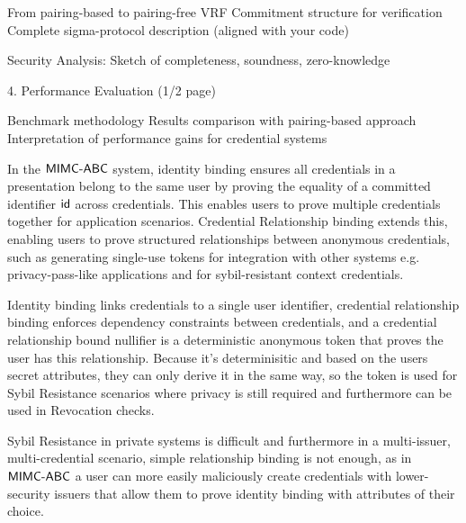 From pairing-based to pairing-free VRF
Commitment structure for verification
Complete sigma-protocol description (aligned with your code)


Security Analysis: Sketch of completeness, soundness, zero-knowledge







4. Performance Evaluation (1/2 page)

Benchmark methodology
Results comparison with pairing-based approach
Interpretation of performance gains for credential systems
























In the $\mathsf{MIMC\text{-}ABC}$ system, identity binding ensures all credentials in a presentation belong to the same user by proving the equality of a committed identifier $\mathsf{id}$ across credentials. This enables users to prove multiple credentials together for application scenarios.
Credential Relationship binding extends this, enabling users to prove structured relationships between anonymous credentials, such as generating single-use tokens for integration with other systems e.g. privacy-pass-like applications \cite{davidson2018privacy} and for sybil-resistant context credentials.

Identity binding links credentials to a single user identifier, credential relationship binding enforces dependency constraints between credentials, and a credential relationship bound nullifier is a deterministic anonymous token that proves the user has this relationship. Because it's determinisitic and based on the users secret attributes, they can only derive it in the same way, so the token is used for Sybil Resistance scenarios where privacy is still required and furthermore can be used in Revocation checks.

Sybil Resistance in private systems is difficult and furthermore in a multi-issuer, multi-credential scenario, simple relationship binding is not enough, as in $\mathsf{MIMC\text{-}ABC}$ a user can more easily maliciously create credentials with lower-security issuers that allow them to prove identity binding with attributes of their choice. 

